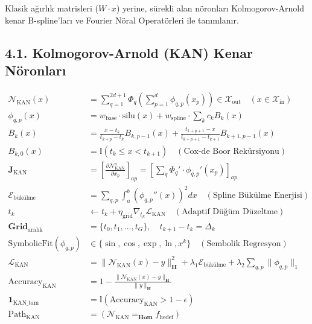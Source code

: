 \documentclass[11pt, a4paper]{article}
\begin{document}
Klasik ağırlık matrisleri ($W \cdot x$) yerine, sürekli alan nöronları Kolmogorov-Arnold kenar B-spline'ları ve Fourier Nöral Operatörleri ile tanımlanır.

\subsection{4.1. Kolmogorov-Arnold (KAN) Kenar Nöronları}
\begin{align}
\mathcal{N}_{\text{KAN}}(x) &= \sum_{q=1}^{2d+1} \Phi_q \left( \sum_{p=1}^d \phi_{q,p}(x_p) \right) \in \mathcal{X}_{\text{out}} \quad (x \in \mathcal{X}_{\text{in}}) \\
\phi_{q,p}(x) &= w_{\text{base}} \cdot \text{silu}(x) + w_{\text{spline}} \cdot \sum_k c_k B_k(x) \\
B_k(x) &= \frac{x - t_k}{t_{k+p} - t_k} B_{k, p-1}(x) + \frac{t_{k+p+1} - x}{t_{k+p+1} - t_{k+1}} B_{k+1, p-1}(x) \\
B_{k, 0}(x) &= \mathbb{I}(t_k \le x < t_{k+1}) \quad (\text{Cox-de Boor Rekürsiyonu}) \\
\mathbf{J}_{\text{KAN}} &= \left[ \frac{\partial \mathcal{N}_{\text{KAN}}^a}{\partial x_p} \right]_{ap} = \left[ \sum_q \Phi_q' \cdot \phi_{q,p}'(x_p) \right]_{ap} \\
\mathcal{E}_{\text{bükülme}} &= \sum_{q,p} \int_{a}^b \left( \phi_{q,p}''(x) \right)^2 dx \quad (\text{Spline Bükülme Enerjisi}) \\
t_k &\leftarrow t_k + \eta_{\text{grid}} \nabla_{t_k} \mathcal{L}_{\text{KAN}} \quad (\text{Adaptif Düğüm Düzeltme}) \\
\mathbf{Grid}_{\text{aralık}} &= \{t_0, t_1, \dots, t_G\}, \quad t_{k+1} - t_k = \Delta_k \\
\text{SymbolicFit}(\phi_{q,p}) &\in \{ \sin, \cos, \exp, \ln, x^k \} \quad (\text{Sembolik Regresyon}) \\
\mathcal{L}_{\text{KAN}} &= \| \mathcal{N}_{\text{KAN}}(x) - y \|_{\mathbf{H}}^2 + \lambda_1 \mathcal{E}_{\text{bükülme}} + \lambda_2 \sum_{q,p} \|\phi_{q,p}\|_1 \\
\text{Accuracy}_{\text{KAN}} &= 1 - \frac{\|\mathcal{N}_{\text{KAN}}(x) - y\|_{\mathbf{H}}}{\|y\|_{\mathbf{H}}} \\
\mathbf{1}_{\text{KAN\_tam}} &= \mathbb{I}\left( \text{Accuracy}_{\text{KAN}} > 1 - \epsilon \right) \\
\text{Path}_{\text{KAN}} &= (\mathcal{N}_{\text{KAN}} =_{\mathbf{Hom}} f_{\text{hedef}})
\end{align}
\end{document}
